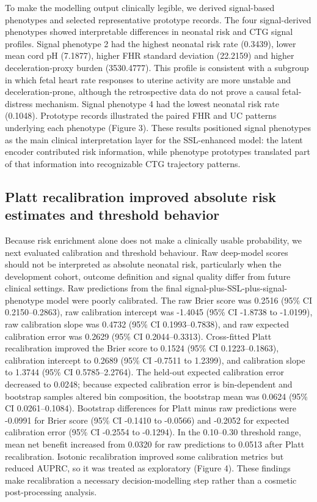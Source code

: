 \documentclass[utf8]{FrontiersinHarvard}
\begin{document}
To make the modelling output clinically legible, we derived signal-based phenotypes and selected representative prototype records. The four signal-derived phenotypes showed interpretable differences in neonatal risk and CTG signal profiles. Signal phenotype 2 had the highest neonatal risk rate (0.3439), lower mean cord pH (7.1877), higher FHR standard deviation (22.2159) and higher deceleration-proxy burden (3530.4777). This profile is consistent with a subgroup in which fetal heart rate responses to uterine activity are more unstable and deceleration-prone, although the retrospective data do not prove a causal fetal-distress mechanism. Signal phenotype 4 had the lowest neonatal risk rate (0.1048). Prototype records illustrated the paired FHR and UC patterns underlying each phenotype (Figure 3). These results positioned signal phenotypes as the main clinical interpretation layer for the SSL-enhanced model: the latent encoder contributed risk information, while phenotype prototypes translated part of that information into recognizable CTG trajectory patterns.

\subsection{Platt recalibration improved absolute risk estimates and threshold behavior}

Because risk enrichment alone does not make a clinically usable probability, we next evaluated calibration and threshold behaviour. Raw deep-model scores should not be interpreted as absolute neonatal risk, particularly when the development cohort, outcome definition and signal quality differ from future clinical settings. Raw predictions from the final signal-plus-SSL-plus-signal-phenotype model were poorly calibrated. The raw Brier score was 0.2516 (95\% CI 0.2150--0.2863), raw calibration intercept was -1.4045 (95\% CI -1.8738 to -1.0199), raw calibration slope was 0.4732 (95\% CI 0.1993--0.7838), and raw expected calibration error was 0.2629 (95\% CI 0.2044--0.3313). Cross-fitted Platt recalibration improved the Brier score to 0.1524 (95\% CI 0.1223--0.1863), calibration intercept to 0.2689 (95\% CI -0.7511 to 1.2399), and calibration slope to 1.3744 (95\% CI 0.5785--2.2764). The held-out expected calibration error decreased to 0.0248; because expected calibration error is bin-dependent and bootstrap samples altered bin composition, the bootstrap mean was 0.0624 (95\% CI 0.0261--0.1084). Bootstrap differences for Platt minus raw predictions were -0.0991 for Brier score (95\% CI -0.1410 to -0.0566) and -0.2052 for expected calibration error (95\% CI -0.2554 to -0.1294). In the 0.10--0.30 threshold range, mean net benefit increased from 0.0320 for raw predictions to 0.0513 after Platt recalibration. Isotonic recalibration improved some calibration metrics but reduced AUPRC, so it was treated as exploratory (Figure 4). These findings make recalibration a necessary decision-modelling step rather than a cosmetic post-processing analysis.
\end{document}
